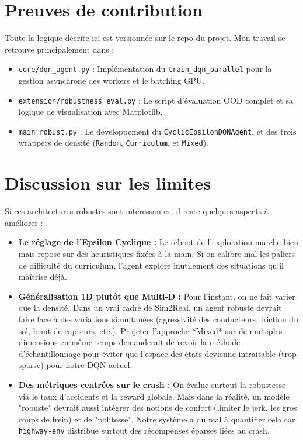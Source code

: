 \documentclass[11pt,a4paper]{article}
\begin{document}
\section{Preuves de contribution}

Toute la logique décrite ici est versionnée sur le repo du projet. Mon travail se retrouve principalement dans :
\begin{itemize}
    \item \texttt{core/dqn\_agent.py} : Implémentation du \texttt{train\_dqn\_parallel} pour la gestion asynchrone des workers et le batching GPU.
    \item \texttt{extension/robustness\_eval.py} : Le script d'évaluation OOD complet et sa logique de visualisation avec Matplotlib.
    \item \texttt{main\_robust.py} : Le développement du \texttt{CyclicEpsilonDQNAgent}, et des trois wrappers de densité (\texttt{Random}, \texttt{Curriculum}, et \texttt{Mixed}).
\end{itemize}

\section{Discussion sur les limites}

Si ces architectures robustes sont intéressantes, il reste quelques aspects à améliorer :
\begin{itemize}
    \item \textbf{Le réglage de l'Epsilon Cyclique :} Le reboot de l'exploration marche bien mais repose sur des heuristiques fixées à la main. Si on calibre mal les paliers de difficulté du curriculum, l'agent explore inutilement des situations qu'il maîtrise déjà.
    \item \textbf{Généralisation 1D plutôt que Multi-D :} Pour l'instant, on ne fait varier que la densité. Dans un vrai cadre de Sim2Real, un agent robuste devrait faire face à des variations simultanées (agressivité des conducteurs, friction du sol, bruit de capteurs, etc.). Projeter l'approche *Mixed* sur de multiples dimensions en même temps demanderait de revoir la méthode d'échantillonnage pour éviter que l'espace des états devienne intraitable (trop sparse) pour notre DQN actuel.
    \item \textbf{Des métriques centrées sur le crash :} On évalue surtout la robustesse via le taux d'accidents et la reward globale. Mais dans la réalité, un modèle "robuste" devrait aussi intégrer des notions de confort (limiter le jerk, les gros coups de frein) et de "politesse". Notre système a du mal à quantifier cela car \texttt{highway-env} distribue surtout des récompenses éparses liées au crash.
\end{itemize}
\end{document}
